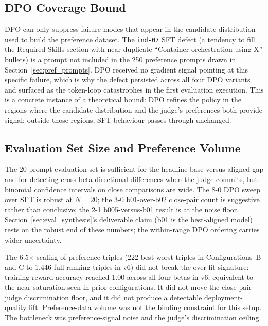 \documentclass[../main.tex]{subfiles}
\begin{document}
\subsection{DPO Coverage Bound}
\label{sec:dpo_coverage}

DPO can only suppress failure modes that appear in the candidate distribution used to build the preference dataset. The \texttt{ind-07} SFT defect (a tendency to fill the Required Skills section with near-duplicate ``Container orchestration using X'' bullets) is a prompt not included in the 250 preference prompts drawn in Section~\ref{sec:pref_prompts}. DPO received no gradient signal pointing at this specific failure, which is why the defect persisted across all four DPO variants and surfaced as the token-loop catastrophes in the first evaluation execution. This is a concrete instance of a theoretical bound: DPO refines the policy in the regions where the candidate distribution and the judge's preferences both provide signal; outside those regions, SFT behaviour passes through unchanged.

\subsection{Evaluation Set Size and Preference Volume}
\label{sec:scale_limits}

The 20-prompt evaluation set is sufficient for the headline base-versus-aligned gap and for detecting cross-beta directional differences when the judge commits, but binomial confidence intervals on close comparisons are wide. The 8-0 DPO sweep over SFT is robust at $N = 20$; the 3-0 b01-over-b02 close-pair count is suggestive rather than conclusive; the 2-1 b005-versus-b01 result is at the noise floor. Section~\ref{sec:eval_synthesis}'s deliverable claim (b01 is the best-aligned model) rests on the robust end of these numbers; the within-range DPO ordering carries wider uncertainty.

The 6.5$\times$ scaling of preference triples (222 best-worst triples in Configurations~B and C to 1{,}446 full-ranking triples in v6) did not break the over-fit signature: training reward accuracy reached 1.00 across all four betas in v6, equivalent to the near-saturation seen in prior configurations. It did not move the close-pair judge discrimination floor, and it did not produce a detectable deployment-quality lift. Preference-data volume was not the binding constraint for this setup. The bottleneck was preference-signal noise and the judge's discrimination ceiling.
\end{document}
